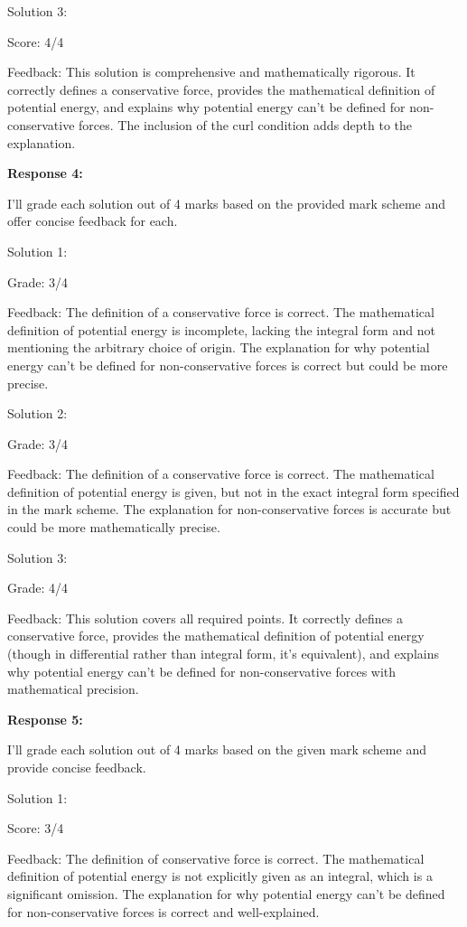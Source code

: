 \documentclass[a4paper,11pt]{article}
\begin{document}
Solution 3:

Score: 4/4

Feedback: This solution is comprehensive and mathematically rigorous. It correctly defines a conservative force, provides the mathematical definition of potential energy, and explains why potential energy can't be defined for non-conservative forces. The inclusion of the curl condition adds depth to the explanation.

\bigskip
\textbf{Response 4:}

I'll grade each solution out of 4 marks based on the provided mark scheme and offer concise feedback for each.

Solution 1:

Grade: 3/4

Feedback: The definition of a conservative force is correct. The mathematical definition of potential energy is incomplete, lacking the integral form and not mentioning the arbitrary choice of origin. The explanation for why potential energy can't be defined for non-conservative forces is correct but could be more precise.

Solution 2:

Grade: 3/4

Feedback: The definition of a conservative force is correct. The mathematical definition of potential energy is given, but not in the exact integral form specified in the mark scheme. The explanation for non-conservative forces is accurate but could be more mathematically precise.

Solution 3:

Grade: 4/4

Feedback: This solution covers all required points. It correctly defines a conservative force, provides the mathematical definition of potential energy (though in differential rather than integral form, it's equivalent), and explains why potential energy can't be defined for non-conservative forces with mathematical precision.

\bigskip
\textbf{Response 5:}

I'll grade each solution out of 4 marks based on the given mark scheme and provide concise feedback.

Solution 1:

Score: 3/4

Feedback: The definition of conservative force is correct. The mathematical definition of potential energy is not explicitly given as an integral, which is a significant omission. The explanation for why potential energy can't be defined for non-conservative forces is correct and well-explained.
\end{document}
